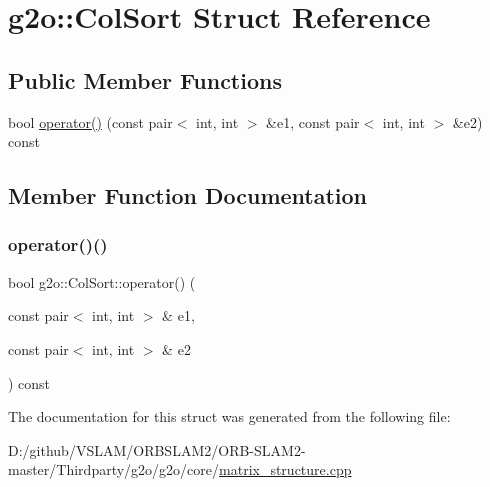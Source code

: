 \hypertarget{structg2o_1_1_col_sort}{}\section{g2o\+:\+:Col\+Sort Struct Reference}
\label{structg2o_1_1_col_sort}
\subsection*{Public Member Functions}
\begin{DoxyCompactItemize}
\item 
bool \mbox{\hyperlink{structg2o_1_1_col_sort_a47d0b6b7473c362d20f10becf55919dc}{operator()}} (const pair$<$ int, int $>$ \&e1, const pair$<$ int, int $>$ \&e2) const
\end{DoxyCompactItemize}


\subsection{Member Function Documentation}
\mbox{\label{structg2o_1_1_col_sort_a47d0b6b7473c362d20f10becf55919dc}} 
\subsubsection{\texorpdfstring{operator()()}{operator()()}}
{\footnotesize\ttfamily bool g2o\+::\+Col\+Sort\+::operator() (\begin{DoxyParamCaption}\item[{const pair$<$ int, int $>$ \&}]{e1,  }\item[{const pair$<$ int, int $>$ \&}]{e2 }\end{DoxyParamCaption}) const\hspace{0.3cm}{\ttfamily [inline]}}



The documentation for this struct was generated from the following file\+:\begin{DoxyCompactItemize}
\item 
D\+:/github/\+V\+S\+L\+A\+M/\+O\+R\+B\+S\+L\+A\+M2/\+O\+R\+B-\/\+S\+L\+A\+M2-\/master/\+Thirdparty/g2o/g2o/core/\mbox{\hyperlink{matrix__structure_8cpp}{matrix\+\_\+structure.\+cpp}}\end{DoxyCompactItemize}
